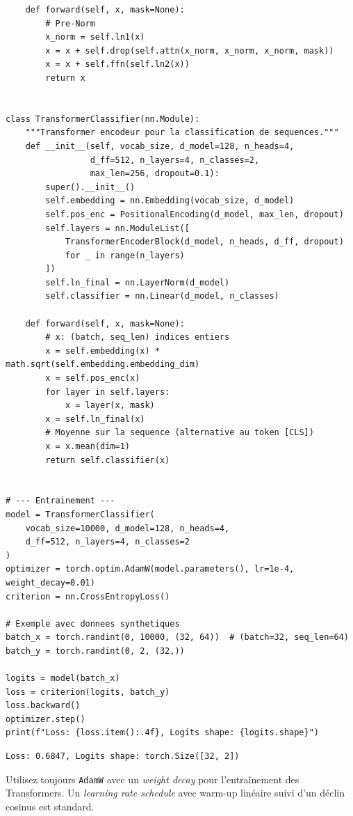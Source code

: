 \begin{codeblock}[title=\textbf{Transformer complet pour la classification de s\'equences}]
\begin{verbatim}
    def forward(self, x, mask=None):
        # Pre-Norm
        x_norm = self.ln1(x)
        x = x + self.drop(self.attn(x_norm, x_norm, x_norm, mask))
        x = x + self.ffn(self.ln2(x))
        return x


class TransformerClassifier(nn.Module):
    """Transformer encodeur pour la classification de sequences."""
    def __init__(self, vocab_size, d_model=128, n_heads=4,
                 d_ff=512, n_layers=4, n_classes=2,
                 max_len=256, dropout=0.1):
        super().__init__()
        self.embedding = nn.Embedding(vocab_size, d_model)
        self.pos_enc = PositionalEncoding(d_model, max_len, dropout)
        self.layers = nn.ModuleList([
            TransformerEncoderBlock(d_model, n_heads, d_ff, dropout)
            for _ in range(n_layers)
        ])
        self.ln_final = nn.LayerNorm(d_model)
        self.classifier = nn.Linear(d_model, n_classes)

    def forward(self, x, mask=None):
        # x: (batch, seq_len) indices entiers
        x = self.embedding(x) * math.sqrt(self.embedding.embedding_dim)
        x = self.pos_enc(x)
        for layer in self.layers:
            x = layer(x, mask)
        x = self.ln_final(x)
        # Moyenne sur la sequence (alternative au token [CLS])
        x = x.mean(dim=1)
        return self.classifier(x)


# --- Entrainement ---
model = TransformerClassifier(
    vocab_size=10000, d_model=128, n_heads=4,
    d_ff=512, n_layers=4, n_classes=2
)
optimizer = torch.optim.AdamW(model.parameters(), lr=1e-4, weight_decay=0.01)
criterion = nn.CrossEntropyLoss()

# Exemple avec donnees synthetiques
batch_x = torch.randint(0, 10000, (32, 64))  # (batch=32, seq_len=64)
batch_y = torch.randint(0, 2, (32,))

logits = model(batch_x)
loss = criterion(logits, batch_y)
loss.backward()
optimizer.step()
print(f"Loss: {loss.item():.4f}, Logits shape: {logits.shape}")
\end{verbatim}
\end{codeblock}

\begin{codeoutput}
\begin{verbatim}
Loss: 0.6847, Logits shape: torch.Size([32, 2])
\end{verbatim}
\end{codeoutput}

\begin{bonnepratique}
Utilisez toujours \texttt{AdamW} avec un \emph{weight decay} pour l'entra\^inement des Transformers. Un \emph{learning rate schedule} avec warm-up lin\'eaire suivi d'un d\'eclin cosinus est standard.
\end{bonnepratique}

